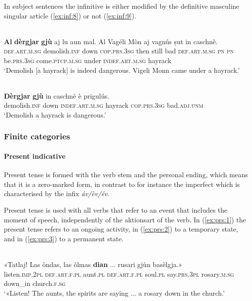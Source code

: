 In subject sentences the infinitive is either modified by the definitive masculine singular article (\ref{ex:inf:8}) or not (\ref{ex:inf:9}).
 
\ea
\label{ex:inf:8}
\\
\gll \textbf{Al} \textbf{dèrgjar} \textbf{gjù} aj lu aun mal. Al Vagéli Mòn aj vagnús ṣut in caschnè.\\
\textsc{def.art.m.sg} demolish.\textsc{inf} down \textsc{cop.prs.3sg} then still bad \textsc{def.art.m.sg} \textsc{pn} \textsc{pn} be.\textsc{prs.3sg} come.\textsc{ptcp.m.sg} under \textsc{indef.art.m.sg} hayrack\\
\glt `Demolish [a hayrack] is indeed dangerous. Vigeli Monn came under a hayrack.'
\z

\ea
\label{ex:inf:9}
\\
\gll \textbf{Dèrgjar} \textbf{gjù} in caschnè è prigulús.\\
demolish.\textsc{inf} down \textsc{indef.art.m.sg} hayrack \textsc{cop.prs.3sg} bad.\textsc{adj.unm}\\
\glt `Demolish a hayrack is dangerous.'
\z

\subsubsection{Finite categories}


\paragraph{Present indicative}
Present tense is formed with the verb stem and the personal ending, which means that it is a zero-marked form, in contrast to for instance the imperfect which is characterised by the infix \textit{áv/èv/év}.

Present tense is used with all verbs that refer to an event that includes the moment of speech, independently of the aktionsart of the verb. In (\ref{ex:prs:1}) the present tense refers to an ongoing activity, in (\ref{ex:prs:2}) to a temporary state, and in (\ref{ex:prs:3}) to a permanent state.
                     
\ea\label{ex:prs:1}
\\
\gll «Tatlaj! Las òndas, las òlmas \textbf{dian} ... rusari gjùn basèlgja.»  \\
listen.\textsc{imp.2pl} \textsc{def.art.f.pl} aunt.\textsc{pl} \textsc{def.art.f.pl} soul.\textsc{pl} say.\textsc{prs.3pl} {} rosary.\textsc{m.sg} down\_in church.\textsc{f.sg}\\
\glt `«Listen! The aunts, the spirits are saying ... a rosary down in the church.'
\z

